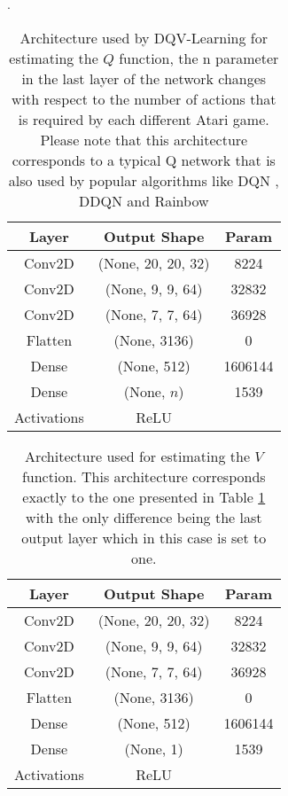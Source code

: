 \begin{table}[ht!]
\centering
\caption{Architecture used by DQV-Learning for estimating the $Q$ function, the n parameter in the last layer of the network changes with respect to the number of actions that is required by each different Atari game. Please note that this architecture corresponds to a typical Q network that is also used by popular algorithms like DQN \cite{mnih2015human}, DDQN \cite{van2015deep} and Rainbow \cite{hessel2018rainbow}}.
\begin{tabular}{c | c | c | }
Layer & Output Shape & Param \\
\hline \hline 
Conv2D & (None, 20, 20, 32) & 8224 \\     
Conv2D & (None, 9, 9, 64) & 32832 \\ 
Conv2D & (None, 7, 7, 64)  & 36928 \\ 
Flatten & (None, 3136) & 0 \\
Dense & (None, 512) & 1606144 \\
Dense & (None, $n$) & 1539 \\
Activations & ReLU & \\

\end{tabular}
\label{tab:table_2}
\end{table}

\begin{table}[ht!]
\centering
\caption{Architecture used for estimating the $V$ function. This architecture corresponds exactly to the one presented in Table \ref{tab:table_2} with the only difference being the last output layer which in this case is set to one.}
\begin{tabular}{c | c | c | }
Layer & Output Shape & Param \\
\hline \hline 
Conv2D & (None, 20, 20, 32) & 8224 \\     
Conv2D & (None, 9, 9, 64) & 32832 \\ 
Conv2D & (None, 7, 7, 64)  & 36928 \\ 
Flatten & (None, 3136) & 0 \\
Dense & (None, 512) & 1606144 \\
Dense & (None, 1) & 1539 \\
Activations & ReLU & \\

\end{tabular}
\label{tab:table_3}
\end{table}




